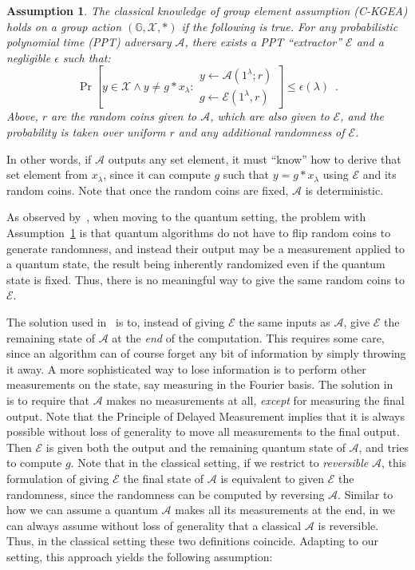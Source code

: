 \documentclass{article}\usepackage[a4paper,margin=20mm]{geometry}
\newtheorem{assumption}[theorem]{Assumption}
\numberwithin{theorem}{section}
\numberwithin{equation}{section}
\newcommand{\G}{\mathbb{G}}
\newcommand{\As}{{\mathcal{A}}}
\newcommand{\Es}{{\mathcal{E}}}
\newcommand{\Xs}{{\mathcal{X}}}
\begin{document}
\begin{assumption}\label{def:ckgea} The \emph{classical knowledge of group element assumption} (C-KGEA) holds on a group action $(\G,\Xs,*)$ if the following is true. For any probabilistic polynomial time (PPT) adversary $\As$, there exists a PPT ``extractor'' $\Es$ and a negligible $\epsilon$ such that:
	\[\Pr\left[y\in\Xs\wedge y\neq g*x_\lambda:\substack{y\gets\As(1^\lambda; r)\\g\gets\Es(1^\lambda,r)}\right]\leq\epsilon(\lambda)\enspace .\]
	Above, $r$ are the random coins given to $\As$, which are also given to $\Es$, and the probability is taken over uniform $r$ and any additional randomness of $\Es$.
\end{assumption}
In other words, if $\As$ outputs any set element, it must ``know'' how to derive that set element from $x_\lambda$, since it can compute $g$ such that $y=g*x_\lambda$ using $\Es$ and its random coins. Note that once the random coins are fixed, $\As$ is deterministic. 

As observed by~\cite{EC:LiuMonZha23}, when moving to the quantum setting, the problem with Assumption~\ref{def:ckgea} is that quantum algorithms do not have to flip random coins to generate randomness, and instead their output may be a measurement applied to a quantum state, the result being inherently randomized even if the quantum state is fixed. Thus, there is no meaningful way to give the same random coins to $\Es$.

The solution used in~\cite{EC:LiuMonZha23} is to, instead of giving $\Es$ the same inputs as $\As$, give $\Es$ the remaining state of $\As$ at the \emph{end} of the computation. This requires some care, since an algorithm can of course forget any bit of information by simply throwing it away. A more sophisticated way to lose information is to perform other measurements on the state, say measuring in the Fourier basis. The solution in~\cite{EC:LiuMonZha23} is to require that $\As$ makes no measurements at all, \emph{except} for measuring the final output. Note that the Principle of Delayed Measurement implies that it is always possible without loss of generality to move all measurements to the final output. Then $\Es$ is given both the output and the remaining quantum state of $\As$, and tries to compute $g$. Note that in the classical setting, if we restrict to \emph{reversible} $\As$, this formulation of giving $\Es$ the final state of $\As$ is equivalent to given $\Es$ the randomness, since the randomness can be computed by reversing $\As$. Similar to how we can assume a quantum $\As$ makes all its measurements at the end, in we can always assume without loss of generality that a classical $\As$ is reversible. Thus, in the classical setting these two definitions coincide. Adapting to our setting, this approach yields the following assumption:
\end{document}
